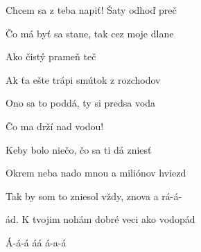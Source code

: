 \begin{song}
\begin{chorusbox}{\Refren}
Chcem sa z teba napiť!  Šaty odhoď preč  \par
Čo má byť sa stane, tak cez moje dlane  \par
Ako čistý prameň teč   \par
Ak ťa ešte trápi  smútok z rozchodov  \par
Ono sa to poddá, ty si predsa voda  \par
Čo ma drží nad vodou!   \par
\end{chorusbox}

\bigskip

 Keby bolo niečo,  čo sa ti dá zniesť \par
{} Okrem neba nado mnou a  miliónov hviezd  \par
{} Tak by som to zniesol  vždy, znova a rá-á- \par
{}ád. K tvojim nohám dobré veci  ako vodopád  \par

\bigskip

 Á-á-á áá á-a-á   \par

\bigskip

\Refren

\bigskip

\Refren\ 

\end{song}
